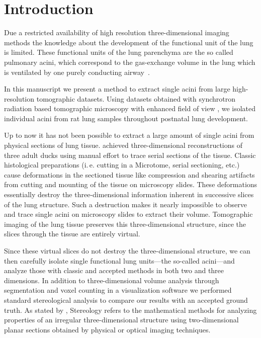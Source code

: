 \documentclass[%
	paper=a4,%
	abstract=true,%
	]{scrartcl}
\newcommand{\ie}{i.\,e.\xspace}
\begin{document}
\clearpage
\section{Introduction}
Due a restricted availability of high resolution three-dimensional imaging methods the knowledge about the development of the functional unit of the lung is limited. These functional units of the lung parenchyma are the so called pulmonary acini, which correspond to the gas-exchange volume in the lung which is ventilated by one purely conducting airway~\cite{Rodriguez1987}.

In this manuscript we present a method to extract single acini from large high-resolution tomographic datasets. Using datasets obtained with synchrotron radiation based tomographic microscopy with enhanced field of view \cite{Haberthuer2010a}, we isolated individual acini from rat lung samples throughout postnatal lung development. 

Up to now it has not been possible to extract a large amount of single acini from physical sections of lung tissue. \citet{Woodward2005} achieved three-dimensional reconstructions of three adult ducks using manual effort to trace serial sections of the tissue. Classic histological preparations (\ie cutting in a Microtome, serial sectioning, etc.) cause deformations in the sectioned tissue like compression and shearing artifacts from cutting and mounting of the tissue on microscopy slides. These deformations essentially destroy the three-dimensional information inherent in successive slices of the lung structure. Such a destruction makes it nearly impossible to observe and trace single acini on microscopy slides to extract their volume. Tomographic imaging of the lung tissue preserves this three-dimensional structure, since the slices through the tissue are entirely virtual.

Since these virtual slices do not destroy the three-dimensional structure, we can then carefully isolate single functional lung units---the so-called acini---and analyze those with classic and accepted methods in both two and three dimensions. In addition to three-dimensional volume analysis through segmentation and voxel counting in a visualization software we performed standard stereological analysis \cite{Hsia2010} to compare our results with an accepted ground truth. As stated by \citet{Hsia2010}, Stereology refers to the mathematical methods for analyzing properties of an irregular three-dimensional structure using two-dimensional planar sections obtained by physical or optical imaging techniques.
\end{document}
